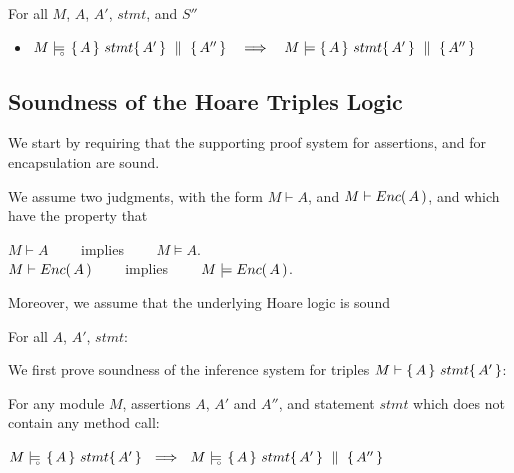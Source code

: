  \begin{lemma}
For all $M$, $A$, $A'$, $stmt$, and $S''$
\begin{itemize}
\item
$M \models\!\!\!\!_{_{\circ}}\   \{\, A \, \}\ stmt \{\, A' \, \} \, \,\parallel\,\, \{\, A'' \, \}     \ \ \ \Longrightarrow \ \ \ M \models  \{\, A \, \}\ stmt \{\, A' \, \} \, \,\parallel\,\, \{\, A'' \, \}  $
\end{itemize}
\end{lemma}


\subsection{Soundness of the Hoare Triples Logic}

We start by requiring  that the supporting proof system for assertions, and for encapsulation are sound.
\begin{axiom}
\label{lemma:axiom:enc:assert:ul}
We assume two judgments, with the    form $M \vdash A$,  and $M \vdash {\ensuremath Enc(\, A\, )}$, and which have the property that
\begin{center}
$M \vdash A $ \ \ \ \ implies \ \ \ \ $M \models A$.\\
 $M \vdash {\ensuremath Enc(\, A\, )} $ \ \ \ \ implies \ \ \ \ $M \models {\ensuremath Enc(\, A\, )}$.
 \end{center}
\end{axiom}

Moreover, we assume that the underlying Hoare logic is sound

\begin{axiom}
\label{ax:ul:sound}
For all $A$, $A'$, $stmt$:\ \ \  
\end{axiom}


\label{sect:prove:triples:sound}
We first prove soundness of the inference system for triples $M \vdash   \{\, A \, \}\ stmt \{\, A' \, \} $:

 
\begin{auxLemma}
\label{l:no:call}
For any module $M$, assertions $A$, $A'$ and $A''$, and statement $stmt$ which does not contain any method call:
\begin{center}
$  \satisfiesD {M} {\triple {A} {stmt} {A'} }  \ \ \Longrightarrow\ \  \satisfiesD {M} {\quadruple {A} {stmt} {A'} {A''}}$
\end{center}
\end{auxLemma}
 


